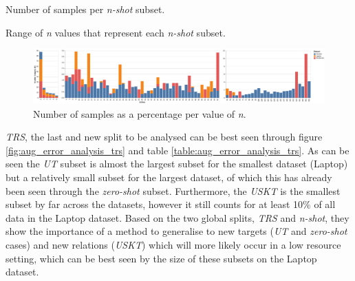 \begin{table}[ht!]
    \centering
    
    \caption{Number of samples per \textit{n-shot} subset.}
    \label{table:aug_error_analysis_n_shot}
\end{table}

\begin{table}[ht!]
    \centering
    
    \caption{Range of \textit{n} values that represent each \textit{n-shot} subset.}
    \label{table:aug_error_analysis_n_shot_n_relation}
\end{table}

\begin{figure}
    \centering
    \includegraphics[scale=0.3]{images/augmentation/error_analysis/n_shot_low_med_high.png}
    \caption{Number of samples as a percentage per value of \textit{n}.}
    \label{fig:aug_n_shot_low_med_high}
\end{figure}

\textit{TRS}, the last and new split to be analysed can be best seen through figure \ref{fig:aug_error_analysis_trs} and table \ref{table:aug_error_analysis_trs}. As can be seen the \textit{UT} subset is almost the largest subset for the smallest dataset (Laptop) but a relatively small subset for the largest dataset, of which this has already been seen through the \textit{zero-shot} subset. Furthermore, the \textit{USKT} is the smallest subset by far across the datasets, however it still counts for at least 10\% of all data in the Laptop dataset. Based on the two global splits, \textit{TRS} and \textit{n-shot}, they show the importance of a method to generalise to new targets (\textit{UT} and \textit{zero-shot} cases) and new relations (\textit{USKT}) which will more likely occur in a low resource setting, which can be best seen by the size of these subsets on the Laptop dataset. 

